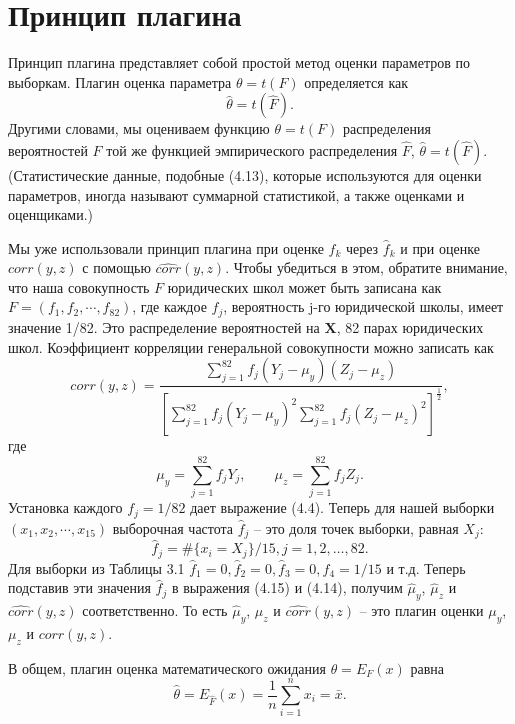 \section{Принцип плагина}

Принцип плагина представляет собой простой метод оценки параметров по выборкам. Плагин оценка параметра $\theta = t (F)$ определяется как 
\begin{equation}
    \hat\theta=t(\hat F).
\end{equation}
Другими словами, мы оцениваем функцию $\theta = t (F)$ распределения вероятностей $F$ той же функцией эмпирического распределения $\hat F$, $\hat\theta = t (\hat F)$. (Статистические данные, подобные (4.13), которые используются для оценки параметров, иногда называют суммарной статистикой, а также оценками и оценщиками.) 

Мы уже использовали принцип плагина при оценке $f_k$ через $\hat f_k$ и при оценке $corr (y, z)$ с помощью $\widehat{corr} (y, z)$. Чтобы убедиться в этом, обратите внимание, что наша совокупность $F$ юридических школ может быть записана как $F = (f_1, f_2,\cdots ,f_82)$, где каждое $f_j$, вероятность j-го юридической школы, имеет значение 1/82. Это распределение вероятностей на $\mathbf{X}$, 82 парах юридических школ. Коэффициент корреляции генеральной совокупности можно записать как 
\begin{equation}
    corr(y,z)=\frac{\sum_{j=1}^{82}f_j(Y_j-\mu_y)(Z_j-\mu_z)}{[\sum_{j=1}^{82}f_j(Y_j-\mu_y)^2\sum_{j=1}^{82}f_j(Z_j-\mu_z)^2]^\frac{1}{2}},
\end{equation}
где
\begin{equation}
    \mu_y=\sum_{j=1}^{82}f_jY_j,\qquad\mu_z=\sum_{j=1}^{82}f_jZ_j.
\end{equation}
Установка каждого $f_j = 1/82$ дает выражение (4.4). Теперь для нашей выборки $(x_1, x_2,\cdots, x_15)$ выборочная частота $\hat f_j$ -- это доля точек выборки, равная $X_j$:
\begin{equation}
    \hat f_j=\#\{x_i=X_j\}/15, j=1,2,\ldots,82.
\end{equation}
Для выборки из Таблицы 3.1 $\hat f_1 = 0, \hat f_2 = 0, \hat f_3 = 0, \hat f_4 = 1/15$ и т.д. Теперь подставив эти значения $\hat f_j$ в выражения (4.15) и (4.14), получим $\hat\mu_y$, $\hat\mu_z$ и $\widehat{corr} (y, z)$ соответственно. То есть $\hat\mu_y$, $\hat\mu_z$ и $\widehat{corr} (y, z)$ -- это плагин оценки $\mu_y$, $\mu_z$ и $corr (y, z)$. 

В общем, плагин оценка математического ожидания $\theta = E_F (x)$ равна 
\begin{equation}
    \hat\theta = E_{\hat F} (x)=\frac{1}{n}\sum_{i=1}^nx_i=\bar x.
\end{equation}

